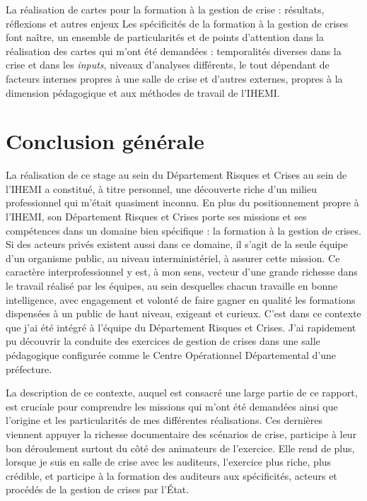 \documentclass[10pt,a4paper]{report} %
\begin{document}
\begin{part}{La réalisation de cartes pour la formation à la gestion de crise : résultats, réflexions et autres enjeux}
Les spécificités de la formation à la gestion de crises font naître, un ensemble de particularités et de points d’attention dans la réalisation des cartes qui m’ont été demandées : temporalités diverses dans la crise et dans les \textit{inputs}, niveaux d’analyses différents, le tout dépendant de facteurs internes propres à une salle de crise et d’autres externes, propres à la dimension pédagogique et aux méthodes de travail de l’IHEMI.



\end{part}


\part{Conclusion générale}

La réalisation de ce stage au sein du Département Risques et Crises au sein de l’IHEMI a constitué, à titre personnel, une découverte riche d’un milieu professionnel qui m’était quasiment inconnu. En plus du positionnement propre à l’IHEMI, son Département Risques et Crises porte ses missions et ses compétences dans un domaine bien spécifique : la formation à la gestion de crises. Si des acteurs privés existent aussi dans ce domaine, il s’agit de la seule équipe d’un organisme public, au niveau interministériel, à assurer cette mission. Ce caractère interprofessionnel y est, à mon sens, vecteur d’une grande richesse dans le travail réalisé par les équipes, au sein desquelles chacun travaille en bonne intelligence, avec engagement et volonté de faire gagner en qualité les formations dispensées à un public de haut niveau, exigeant et curieux. C’est dans ce contexte que j’ai été intégré à l’équipe du Département Risques et Crises. J’ai rapidement pu découvrir la conduite des exercices de gestion de crises dans une salle pédagogique configurée comme le Centre Opérationnel Départemental d’une préfecture. 

La description de ce contexte, auquel est consacré une large partie de ce rapport, est cruciale pour comprendre les missions qui m’ont été demandées ainsi que l’origine et les particularités de mes différentes réalisations. Ces dernières viennent appuyer la richesse documentaire des scénarios de crise, participe à leur bon déroulement surtout du côté des animateurs de l’exercice. Elle rend de plus, lorsque je suis en salle de crise avec les auditeurs, l’exercice plus riche, plus crédible, et participe à la formation des auditeurs aux spécificités, acteurs et procédés de la gestion de crises par l’État. 
\end{document}
